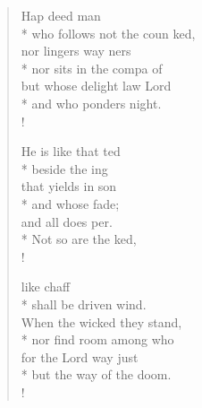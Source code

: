 \documentclass[10pt,a5paper,twoside]{report}
\begin{document}
\begin{flushleft}
\begin{verse}

 Hap deed   man\\*
who follows not the coun   ked,\\
nor lingers   way  ners\\*
nor sits in the compa of \\
 but whose delight   law   Lord\\*
and who ponders     night.\\!

 He is like   that  ted\\*
beside the ing \\
that yields   in  son\\*
and whose    fade;\\
and all   does  per.\\*
 Not so are the ked,  \\!

  like  chaff\\*
shall be driven    wind.\\
 When the wicked   they   stand,\\*
nor find room among  who  \\
 for the Lord   way   just\\*
but the way of the    doom.\\!
\end{verse}
\end{flushleft}
\end{document}
